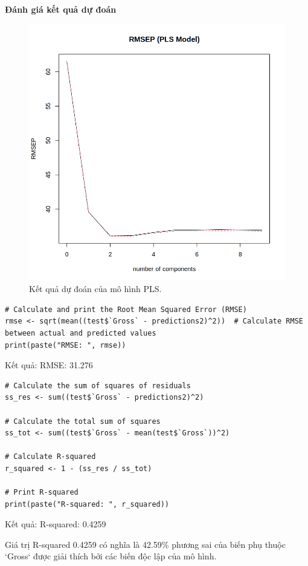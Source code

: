\textbf{Đánh giá kết quả dự đoán}

\begin{figure}[H]
    \centering
    \includegraphics[width=0.75\columnwidth]{csm_figures/pls_part01.png}
    \caption{Kết quả dự đoán của mô hình PLS.}
    \label{fig:pls_predict_part01}
\end{figure}

\begin{lstlisting}
# Calculate and print the Root Mean Squared Error (RMSE)
rmse <- sqrt(mean((test$`Gross` - predictions2)^2))  # Calculate RMSE between actual and predicted values
print(paste("RMSE: ", rmse)) 
\end{lstlisting}

Kết quả: RMSE:  31.276

\begin{lstlisting}
# Calculate the sum of squares of residuals
ss_res <- sum((test$`Gross` - predictions2)^2)

# Calculate the total sum of squares
ss_tot <- sum((test$`Gross` - mean(test$`Gross`))^2)

# Calculate R-squared
r_squared <- 1 - (ss_res / ss_tot)

# Print R-squared
print(paste("R-squared: ", r_squared))
\end{lstlisting}

Kết quả: R-squared:  0.4259

Giá trị R-squared 0.4259 có nghĩa là 42.59\% phương sai của biến phụ thuộc `Gross` được giải thích bởi các biến độc lập của mô hình.

